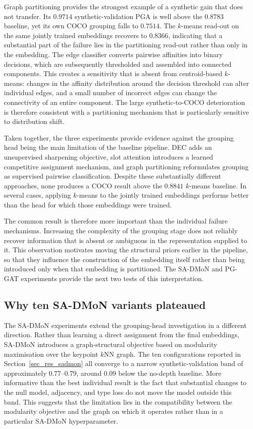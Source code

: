 Graph partitioning provides the strongest example of a synthetic gain
that does not transfer.
Its $0.9714$ synthetic-validation PGA is well above the $0.8783$
baseline,
yet its own COCO grouping falls to $0.7514$.
The $k$-means read-out on the same jointly trained embeddings recovers
to $0.8366$,
indicating that a substantial part of the failure lies in the
partitioning read-out rather than only in the embedding.
The edge classifier converts pairwise affinities into binary decisions,
which are subsequently thresholded and assembled into connected
components.
This creates a sensitivity that is absent from centroid-based $k$-means:
changes in the affinity distribution around the decision threshold
can alter individual edges,
and a small number of incorrect edges can change the connectivity
of an entire component.
The large synthetic-to-COCO deterioration is therefore consistent with
a partitioning mechanism that is particularly sensitive to distribution
shift.

Taken together, the three experiments provide evidence against the
grouping head being the main limitation of the baseline pipeline.
DEC adds an unsupervised sharpening objective,
slot attention introduces a learned competitive assignment mechanism,
and graph partitioning reformulates grouping as supervised pairwise
classification.
Despite these substantially different approaches,
none produces a COCO result above the $0.8841$ $k$-means baseline.
In several cases, applying $k$-means to the jointly trained embeddings
performs better than the head for which those embeddings were trained.

The common result is therefore more important than the individual
failure mechanisms.
Increasing the complexity of the grouping stage does not reliably
recover information that is absent or ambiguous in the representation
supplied to it.
This observation motivates moving the structural priors earlier
in the pipeline,
so that they influence the construction of the embedding itself
rather than being introduced only when that embedding is partitioned.
The SA-DMoN and PG-GAT experiments provide the next two tests
of this interpretation.

\subsection{Why ten SA-DMoN variants plateaued}
\label{sec_disc_embedding_sadmon}

The SA-DMoN experiments extend the grouping-head investigation in a
different direction.
Rather than learning a direct assignment from the final embeddings,
SA-DMoN introduces a graph-structural objective based on modularity
maximisation over the keypoint $k$NN graph.
The ten configurations reported in Section~\ref{sec_res_sadmon}
all converge to a narrow synthetic-validation band of approximately
$0.77$--$0.79$,
around $0.09$ below the no-depth baseline.
More informative than the best individual result is the fact that
substantial changes to the null model,
adjacency,
and type loss do not move the model outside this band.
This suggests that the limitation lies in the compatibility between
the modularity objective and the graph on which it operates
rather than in a particular SA-DMoN hyperparameter.

